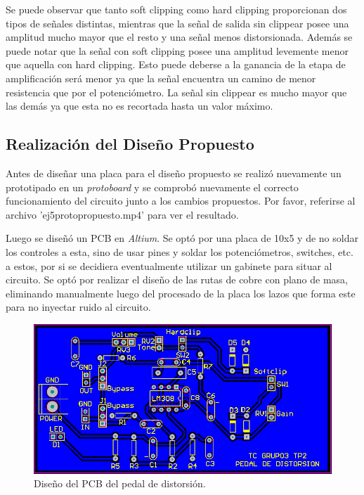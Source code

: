 Se puede observar que tanto soft clipping como hard clipping proporcionan dos tipos de señales distintas, mientras que la señal de salida sin clippear posee una amplitud mucho mayor que el resto y una señal menos distorsionada. Además se puede notar que la señal con soft clipping posee una amplitud levemente menor que aquella con hard clipping. Esto puede deberse a la ganancia de la etapa de amplificación será menor ya que la señal encuentra un camino de menor resistencia que por el potenciómetro. La señal sin clippear es mucho mayor que las demás ya que esta no es recortada hasta un valor máximo.

\subsection{Realización del Diseño Propuesto}

Antes de diseñar una placa para el diseño propuesto se realizó nuevamente un prototipado en un \textit{protoboard} y se comprobó nuevamente el correcto funcionamiento del circuito junto a los cambios propuestos. Por favor, referirse al archivo 'ej5protopropuesto.mp4' para ver el resultado.


Luego se diseñó un PCB en \textit{Altium}. Se optó por una placa de 10x5 y de no soldar los controles a esta, sino de usar pines y soldar los potenciómetros, switches, etc. a estos, por si se decidiera eventualmente utilizar un gabinete para situar al circuito.
Se optó por realizar el diseño de las rutas de cobre con plano de masa, eliminando manualmente luego del procesado de la placa los lazos que forma este para no inyectar ruido al circuito.\\

\begin{figure}[H]
	\centering
	\includegraphics[width=1\textwidth, trim={0 0 0 0}, clip]{Ejercicio5/Imagenes/Circuito_base/Sim/pcb.png}
	\caption{Diseño del PCB del pedal de distorsión.}
	\label{fig:pcb}
\end{figure}

